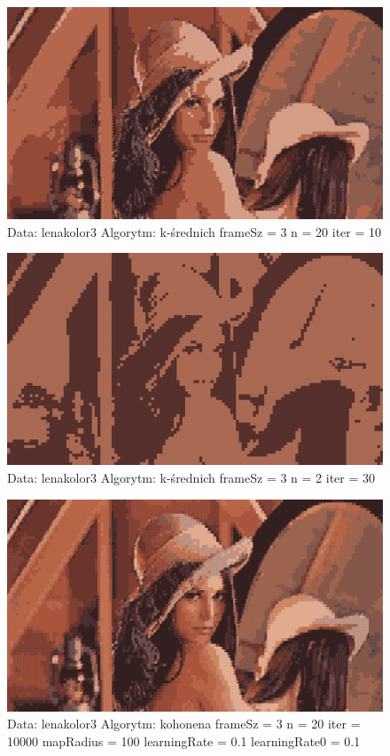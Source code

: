 \documentclass{classrep}
\begin{document}
{{{\newpage

\begin{figure}[h!]
\centering
 \includegraphics[width=12cm]{img/kmeans_2.png}
 \vspace{-0.0cm}
 \caption{Data: lenakolor3 Algorytm: k-średnich frameSz = 3 n = 20 iter = 10
}
\end{figure}

\begin{figure}[h!]
\centering
 \includegraphics[width=12cm]{img/kmeans_4.png}
 \vspace{-0.0cm}
 \caption{Data: lenakolor3 Algorytm: k-średnich frameSz = 3 n = 2 iter = 30
}
\end{figure}

\newpage

\begin{figure}[h!]
\centering
 \includegraphics[width=12cm]{img/kohonen_4.png}
 \vspace{-0.0cm}
 \caption{Data: lenakolor3 Algorytm: kohonena frameSz = 3 n = 20 iter = 10000 mapRadius = 100 learningRate = 0.1 learningRate0 = 0.1
}
\end{figure}

}}}
\end{document}
